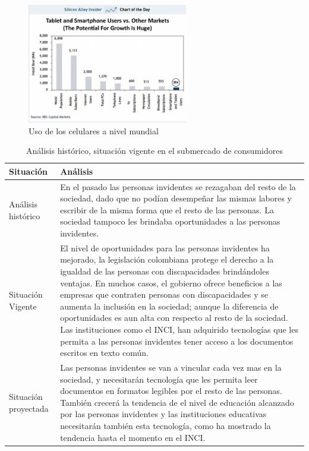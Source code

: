 \documentclass[a4paper, 12pt, oneside]{article}
\begin{document}
	\begin{figure}[htb]
	\begin{center}
	\leavevmode
	\includegraphics[width=7cm]{img/usocel1.jpg}
	\end{center}
	\caption{Uso de los celulares a nivel mundial}
	\label{fig:usocel1}
	\end{figure}
	
	\begin{table}
		\caption{Análisis histórico, situación vigente en el submercado de consumidores}
		\begin{tabular}{ | p{4cm} | p{10cm} | }
		\hline
		Situación & Análisis \\
		\hline					
		Análisis histórico & 
		En el pasado las personas invidentes se rezagaban del resto de la sociedad, dado que no podían desempeñar las mismas labores y escribir de la misma forma que el resto de las personas. La sociedad tampoco les brindaba oportunidades a las personas invidentes. \\
		\hline
		Situación Vigente &
		El nivel de oportunidades para las personas invidentes ha mejorado, la legislación colombiana protege el derecho a la igualdad de las personas con discapacidades brindándoles ventajas. En muchos casos, el gobierno ofrece beneficios a las empresas que contraten personas con discapacidades y se aumenta la inclusión en la sociedad; aunque la diferencia de oportunidades es aun alta con respecto al resto de la sociedad. Las instituciones como el INCI, han adquirido tecnologías que les permita a las personas invidentes tener acceso a los documentos escritos en texto común. \\
		\hline
		Situación proyectada &
		Las personas invidentes se van a vincular cada vez mas en la sociedad, y necesitarán tecnología que les permita leer documentos en formatos legibles por el resto de las personas. También crecerá la tendencia de el nivel de educación alcanzado por las personas invidentes y las instituciones educativas necesitarán también esta tecnología, como ha mostrado la tendencia hasta el momento en el INCI.
		 \\
		\hline
		\end{tabular}
		\label{consHistorico}
	\end{table}
	
\end{document}
